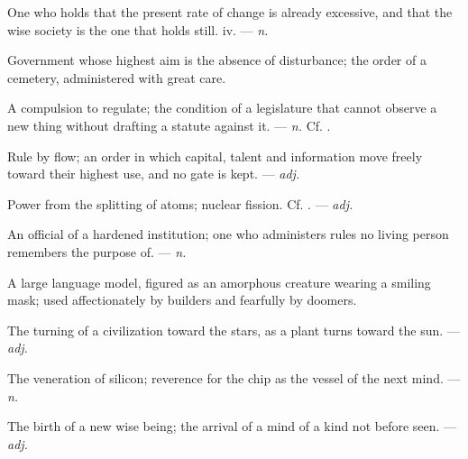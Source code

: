  One who holds that the present rate of change is already excessive, and that the wise society is the one that holds still.   iv. ---  \textit{n.}

 Government whose highest aim is the absence of disturbance; the order of a cemetery, administered with great care.

 A compulsion to regulate; the condition of a legislature that cannot observe a new thing without drafting a statute against it. ---  \textit{n.} Cf. .

 Rule by flow; an order in which capital, talent and information move freely toward their highest use, and no gate is kept. ---  \textit{adj.}

 Power from the splitting of atoms; nuclear fission. Cf. . ---  \textit{adj.}

 An official of a hardened institution; one who administers rules no living person remembers the purpose of. ---  \textit{n.}

  A large language model, figured as an amorphous creature wearing a smiling mask; used affectionately by builders and fearfully by doomers.

 The turning of a civilization toward the stars, as a plant turns toward the sun. ---  \textit{adj.}

 The veneration of silicon; reverence for the chip as the vessel of the next mind. ---  \textit{n.}

 The birth of a new wise being; the arrival of a mind of a kind not before seen. ---  \textit{adj.}

